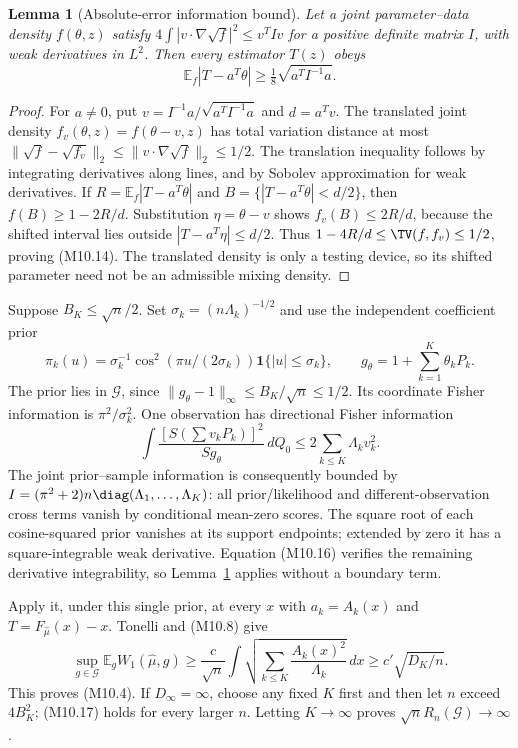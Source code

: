 \documentclass[11pt,a4paper]{article}
\newtheorem{lemma}[theorem]{Lemma}
\theoremstyle{definition}\newtheorem{definition}[theorem]{Definition}
\theoremstyle{remark}\newtheorem{remark}[theorem]{Remark}
\newcommand{\E}{\mathbb E}\newcommand{\one}{\mathbf 1}\newcommand{\1}{\mathbf 1}
\numberwithin{equation}{section}
\begin{document}
\begin{lemma}[Absolute-error information bound]\label{M10-lem:translation}
Let a joint parameter--data density $f(\theta,z)$ satisfy
$4\int|v\cdot\nabla\sqrt f|^2\le v^TIv$ for a positive definite matrix $I$, with weak derivatives in $L^2$. Then every estimator $T(z)$ obeys
\[
 \E_f|T-a^T\theta|\ge\tfrac18\sqrt{a^TI^{-1}a}.\tag{M10.14}
\]
\end{lemma}
\begin{proof}
For $a\ne0$, put $v=I^{-1}a/\sqrt{a^TI^{-1}a}$ and $d=a^Tv$. The translated joint density $f_v(\theta,z)=f(\theta-v,z)$ has total variation distance at most
$\|\sqrt f-\sqrt{f_v}\|_2\le\|v\cdot\nabla\sqrt f\|_2\le1/2$.
The translation inequality follows by integrating derivatives along lines, and by Sobolev approximation for weak derivatives. If $R=\E_f|T-a^T\theta|$ and $B=\{|T-a^T\theta|<d/2\}$, then $f(B)\ge1-2R/d$. Substitution $\eta=\theta-v$ shows $f_v(B)\le2R/d$, because the shifted interval lies outside $|T-a^T\eta|\le d/2$. Thus $1-4R/d\le\TV(f,f_v)\le1/2$, proving (M10.14). The translated density is only a testing device, so its shifted parameter need not be an admissible mixing density.
\end{proof}

Suppose $B_K\le\sqrt n/2$. Set $\sigma_k=(n\Lambda_k)^{-1/2}$ and use the independent coefficient prior
\[
 \pi_k(u)=\sigma_k^{-1}\cos^2(\pi u/(2\sigma_k))\1\{|u|\le\sigma_k\},
 \qquad g_\theta=1+\sum_{k=1}^K\theta_kP_k.
\tag{M10.15}
\]
The prior lies in $\mathcal G$, since $\|g_\theta-1\|_\infty\le B_K/\sqrt n\le1/2$. Its coordinate Fisher information is $\pi^2/\sigma_k^2$. One observation has directional Fisher information
\[
 \int\frac{[S(\sum v_kP_k)]^2}{Sg_\theta}\,dQ_0
 \le2\sum_{k\le K}\Lambda_kv_k^2.\tag{M10.16}
\]
The joint prior--sample information is consequently bounded by
$I=(\pi^2+2)n\diag(\Lambda_1,\ldots,\Lambda_K)$: all prior/likelihood and different-observation cross terms vanish by conditional mean-zero scores. The square root of each cosine-squared prior vanishes at its support endpoints; extended by zero it has a square-integrable weak derivative. Equation (M10.16) verifies the remaining derivative integrability, so Lemma~\ref{M10-lem:translation} applies without a boundary term.

Apply it, under this single prior, at every $x$ with $a_k=A_k(x)$ and $T=F_{\widehat\mu}(x)-x$. Tonelli and (M10.8) give
\[
 \sup_{g\in\mathcal G}\E_g W_1(\widehat\mu,g)
 \ge\frac{c}{\sqrt n}\int\sqrt{\sum_{k\le K}\frac{A_k(x)^2}{\Lambda_k}}\,dx
 \ge c'\sqrt{D_K/n}.\tag{M10.17}
\]
This proves (M10.4). If $D_\infty=\infty$, choose any fixed $K$ first and then let $n$ exceed $4B_K^2$; (M10.17) holds for every larger $n$. Letting $K\to\infty$ proves $\sqrt n R_n(\mathcal G)\to\infty$.
\end{document}
